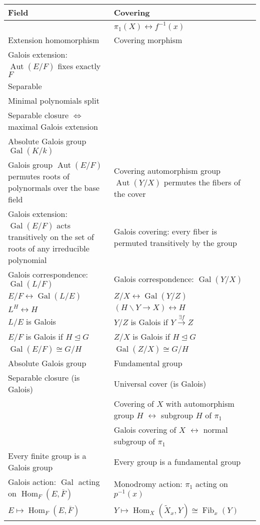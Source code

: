 \documentclass{article}
\begin{document}
\begin{longtable}{>{\raggedright\arraybackslash}m{.45\linewidth}>{\raggedright\arraybackslash}m{.45\linewidth}}
\toprule
Field & Covering \\
\midrule
& $\pi_1(X) \leftrightarrow f^{-1}(x)$ \\
Extension homomorphism & Covering morphism \\
\midrule
{Galois extension: $\operatorname{Aut}(E/F)$ fixes exactly $F$} & \\
Separable \\
Minimal polynomials split \\
Separable closure $\Leftrightarrow$ maximal Galois extension \\
Absolute Galois group $\operatorname{Gal}(K/k)$ \\
\midrule
Galois group $\operatorname{Aut}(E/F)$ permutes roots of polynormals over the base field & Covering automorphism group $\operatorname{Aut}(Y/X)$ permutes the fibers of the cover  \\
Galois extension: $\operatorname{Gal}(E/F)$ acts transitively on the set of roots of any irreducible polynomial & Galois covering: every fiber is permuted transitively by the group \\
\midrule
Galois correspondence: $\operatorname{Gal}(L/F)$ & Galois correspondence: $\operatorname{Gal}(Y/X)$ \\
$E/F \leftrightarrow \operatorname{Gal}(L/E)$ & $Z/X \leftrightarrow \operatorname{Gal}(Y/Z)$ \\
$L^H \leftrightarrow H$ & $(H\backslash Y\rightarrow X) \leftrightarrow H$ \\
$L/E$ is Galois & $Y/Z$ is Galois if $Y\xrightarrow{\exists f} Z$ \\
$E/F$ is Galois if $H \trianglelefteq G$ & $Z/X$ is Galois if $H \trianglelefteq G$ \\
$\operatorname{Gal}(E/F) \cong G/H$ & $\operatorname{Gal}(Z/X) \cong G/H$ \\
\midrule
Absolute Galois group & Fundamental group \\
Separable closure (is Galois) & Universal cover (is Galois) \\
& Covering of $X$ with automorphism group $H$ $\leftrightarrow$ subgroup $H$ of $\pi_1$ \\
& Galois covering of $X$ $\leftrightarrow$ normal subgroup of $\pi_1$ \\
\midrule
Every finite group is a Galois group & Every group is a fundamental group \\
Galois action: $\operatorname{Gal}$ acting on $\operatorname{Hom}_F(E,\overline{F})$ & Monodromy action: $\pi_1$ acting on $p^{-1}(x)$ \\
$E \mapsto \operatorname{Hom}_F(E,\overline{F})$ & $Y\mapsto \operatorname{Hom}_X(\tilde{X}_x,Y) \cong \operatorname{Fib}_x(Y)$ \\
\bottomrule
\end{longtable}
\end{document}

